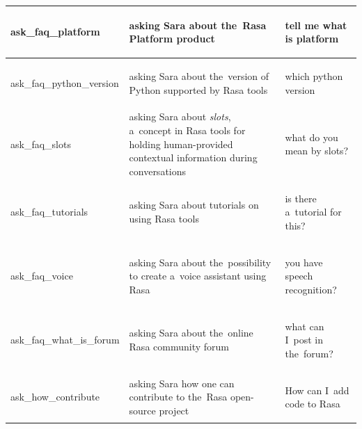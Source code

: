 \documentclass[bsc,frontabs,singlespacing,parskip,deptreport]{infthesis}
\begin{document}
{\begin{center}
\begin{longtable}{p{}|p{}|p{}}
    \hline
    \begin{spverbatim}ask_faq_platform\end{spverbatim} & asking Sara about the~Rasa Platform product & \begin{spverbatim}tell me what is platform\end{spverbatim} \\
    \hline
    \begin{spverbatim}ask_faq_python_version\end{spverbatim} & asking Sara about the~version of Python supported by Rasa tools & \begin{spverbatim}which python version\end{spverbatim} \\
    \hline
    \begin{spverbatim}ask_faq_slots\end{spverbatim} & asking Sara about \textit{slots}, a~concept in Rasa tools for holding human-provided contextual information during conversations & \begin{spverbatim}what do you mean by slots?\end{spverbatim} \\
    \hline
    \begin{spverbatim}ask_faq_tutorials\end{spverbatim} & asking Sara about tutorials on using Rasa tools & \begin{spverbatim}is there a~tutorial for this?\end{spverbatim} \\
    \hline
    \begin{spverbatim}ask_faq_voice\end{spverbatim} & asking Sara about the~possibility to create a~voice assistant using Rasa & \begin{spverbatim}you have speech recognition?\end{spverbatim} \\
    \hline
    \begin{spverbatim}ask_faq_what_is_forum\end{spverbatim} & asking Sara about the~online Rasa community forum & \begin{spverbatim}what can I~post in the~forum?\end{spverbatim} \\
    \hline
    \begin{spverbatim}ask_how_contribute\end{spverbatim} & asking Sara how one can contribute to the~Rasa open-source project & \begin{spverbatim}How can I~add code to Rasa\end{spverbatim} \\

\end{longtable}
\end{center}}
\end{document}
